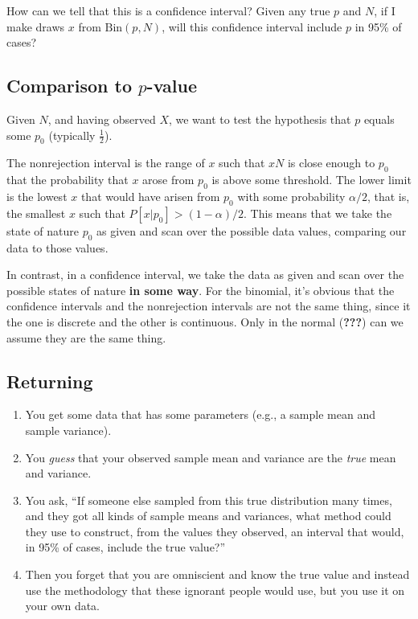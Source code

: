 \documentclass{book}
\providecommand{\tightlist}{%
  \setlength{\itemsep}{0pt}\setlength{\parskip}{0pt}}
\begin{document}
How can we tell that this is a confidence interval? Given any true \(p\)
and \(N\), if I make draws \(x\) from \(\mathrm{Bin}(p, N)\), will this
confidence interval include \(p\) in 95\% of cases?

\subsection{\texorpdfstring{Comparison to
\(p\)-value}{Comparison to p-value}}\label{comparison-to-p-value}

Given \(N\), and having observed \(X\), we want to test the hypothesis
that \(p\) equals some \(p_0\) (typically \(\tfrac{1}{2}\)).

The nonrejection interval is the range of \(x\) such that \(x N\) is
close enough to \(p_0\) that the probability that \(x\) arose from
\(p_0\) is above some threshold. The lower limit is the lowest \(x\)
that would have arisen from \(p_0\) with some probability \(\alpha/2\),
that is, the smallest \(x\) such that \(P[x | p_0] > (1-\alpha)/2\).
This means that we take the state of nature \(p_0\) as given and scan
over the possible data values, comparing our data to those values.

In contrast, in a confidence interval, we take the data as given and
scan over the possible states of nature \textbf{in some way}. For the
binomial, it's obvious that the confidence intervals and the
nonrejection intervals are not the same thing, since it the one is
discrete and the other is continuous. Only in the normal (\textbf{???})
can we assume they are the same thing.

\subsection{Returning}\label{returning}

\begin{enumerate}
\def\labelenumi{\arabic{enumi}.}
\tightlist
\item
  You get some data that has some parameters (e.g., a sample mean and
  sample variance).
\item
  You \emph{guess} that your observed sample mean and variance are the
  \emph{true} mean and variance.
\item
  You ask, ``If someone else sampled from this true distribution many
  times, and they got all kinds of sample means and variances, what
  method could they use to construct, from the values they observed, an
  interval that would, in 95\% of cases, include the true value?''
\item
  Then you forget that you are omniscient and know the true value and
  instead use the methodology that these ignorant people would use, but
  you use it on your own data.
\end{enumerate}
\end{document}
